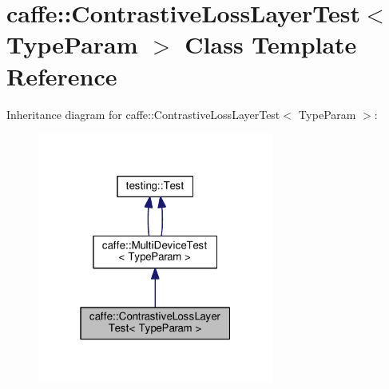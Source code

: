\hypertarget{classcaffe_1_1_contrastive_loss_layer_test}{}\section{caffe\+:\+:Contrastive\+Loss\+Layer\+Test$<$ Type\+Param $>$ Class Template Reference}
\label{classcaffe_1_1_contrastive_loss_layer_test}


Inheritance diagram for caffe\+:\+:Contrastive\+Loss\+Layer\+Test$<$ Type\+Param $>$\+:
\nopagebreak
\begin{figure}[H]
\begin{center}
\leavevmode
\includegraphics[width=220pt]{classcaffe_1_1_contrastive_loss_layer_test__inherit__graph}
\end{center}
\end{figure}
